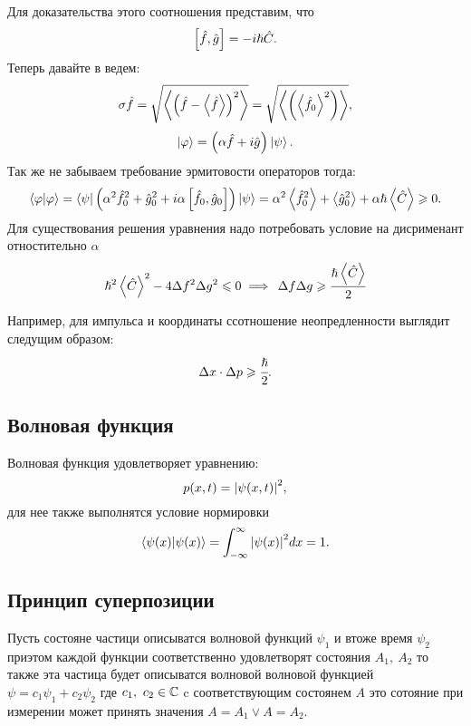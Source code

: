 \stp Для доказательства этого соотношения представим, что
\begin{equation*} 
 \insqr{\hat f, \hat g} = - i \hslash \hat C.
\end{equation*}  
Теперь давайте в ведем:
\begin{equation*} 
  \sigma \hat f = \sqrt{\ave{\inner{\hat f - \ave{\hat f}}^2 }} 
  = \sqrt{\ave{\inner{ \ave{\hat f_0}^2 }}},
\end{equation*} 
\begin{equation*} 
 \ket{\phi } = \inner{\alpha \hat f + i \hat g }\ket{\psi}.
\end{equation*} 
Так же не забываем требование эрмитовости операторов тогда:
\begin{equation*} 
 \braket{\phi}{\phi} = \bra{\psi} \inner{\alpha^2 \hat f_0^2 + 
 \hat g_0^2 + i\alpha \insqr{\hat f_0, \hat g_0}} \ket{\psi} = 
 \alpha^2 \ave{\hat f_0^2} +  \ave{ \hat g_0^2} + \alpha \hslash 
 \ave{\hat C} \geq 0.
\end{equation*} 
Для существования решения уравнения надо потребовать условие на 
дисрименант отностительно $ \alpha $
\begin{equation*} 
 \hslash^2 \ave{\hat C}^2 - 4 \Delta f^2 \Delta g^2 \leq 0 \implies\, 
 \Delta f \Delta g \geq \cfrac{\hslash\ave{\hat C}}{2} 
\end{equation*} 
\enp

Например, для импульса и координаты ссотношение неопредленности 
выглядит следущим образом:
\begin{equation} 
 \Delta x \cdot \Delta p \geq \cfrac{\hslash}{2}.
\end{equation} 

\subsection{Волновая функция}
Волновая функция удовлетворяет уравнению:
\begin{equation} 
 p (x, t) = \abs{\psi (x, t)}^2,
\end{equation} 
для нее также выполнятся условие нормировки 
\begin{equation} 
  \label{eq:1.6}
 \braket{\psi (x)}{\psi (x)} = \int_{-\infty}^{\infty} 
  \abs{\psi (x)}^2 dx = 1.
\end{equation} 
   
\subsection{Принцип суперпозиции}
Пусть состояне частици описыватся волновой функций $\psi_1$
 и втоже время $\psi_2$ приэтом каждой функции соответственно удовлетворят
 состояния $A_1, \ A_2$ то также эта частица будет описыватся волновой 
 волновой функцией $\psi = c_1 \psi_1 + c_2 \psi_2$ где $c_1, \ c_2 \in 
 \com$ c соответствующим состоянем $A$ это сотояние при 
 измерении может принять значения $A = A_1 \lor A = A_2$.


